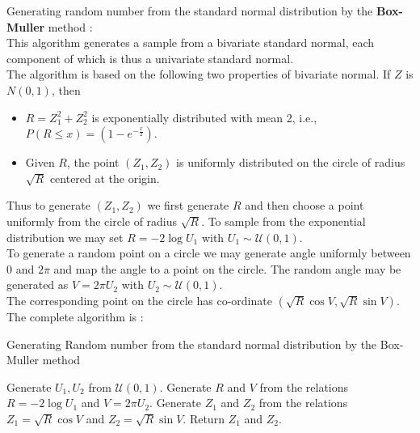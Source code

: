 \documentclass[11pt]{article}
\begin{document}
\noindent{}Generating random number from the standard normal distribution by the \textbf{Box-Muller} method :\\
This algorithm generates a sample from a bivariate standard normal, each component of which is thus a univariate standard normal.\\
The algorithm is based on the following two properties of bivariate normal. If $Z$ is $N(0, 1)$, then
\begin{itemize}
	\item $R = Z_{1}^{2} + Z_{2}^{2}$ is exponentially distributed with mean 2, i.e., $P(R \leq x) = (1 - e^{-\frac{x}{2}})$.
	\item Given $R$, the point $(Z_1, Z_2)$ is uniformly distributed on the circle of radius $\sqrt{R}$ centered at the origin.
\end{itemize}
Thus to generate $(Z_1, Z_2)$ we first generate $R$ and then choose a point uniformly from the circle of radius $\sqrt{R}$.
To sample from the exponential distribution we may set $R = −2\log{U_1}$ with $U_1 \sim \mathcal{U}(0,1)$.\\
To generate a random point on a circle we may generate angle uniformly between 0 and $2\pi$ and map the angle to a point on the circle.
The random angle may be generated as $V = 2\pi U_2$ with $U_2 \sim \mathcal{U}(0,1)$.\\
The corresponding point on the circle has co-ordinate $(\sqrt{R}\cos{V}, \sqrt{R}\sin{V})$.\\
The complete algorithm is :
\begin{algorithm}[H]
\caption{Generating Random number from the standard normal distribution by the Box-Muller method}
\begin{algorithmic}[1]
\STATE Generate $U_1, U_2$ from $\mathcal{U}(0,1)$.
\STATE Generate $R$ and $V$ from the relations $R = −2\log{U_1}$ and $V = 2\pi U_2$.
\STATE Generate $Z_1$ and $Z_2$ from the relations $Z_1 = \sqrt{R}\cos{V}$ and $Z_2 = \sqrt{R}\sin{V}$.
\STATE Return $Z_1$ and $Z_2$.
\end{algorithmic}
\end{algorithm}
\end{document}
